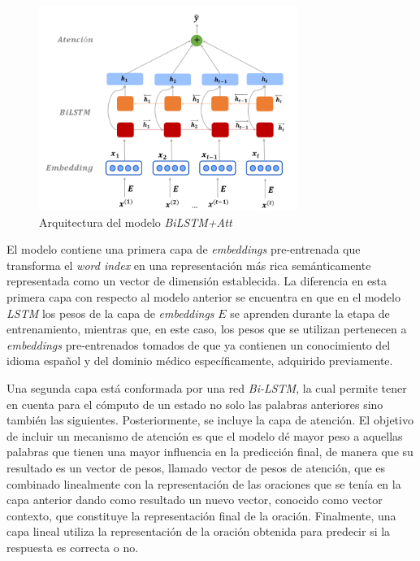 \begin{figure}[!tb]
  \begin{center}
    \includegraphics[angle=0, width=0.75\textwidth]{Graphics/bilstm.png}
  \end{center}
    \caption{Arquitectura del modelo \textit{BiLSTM+Att}}\label{bilstm}
\end{figure}

El modelo contiene una primera capa de \textit{embeddings} pre-entrenada que transforma el \textit{word index} en una representación más rica semánticamente representada como un vector de dimensión establecida. La diferencia en esta primera capa con respecto al modelo anterior se  encuentra en que en el modelo \textit{LSTM} los pesos de la capa de \textit{embeddings} $E$ se aprenden durante la etapa de entrenamiento, mientras que, en este caso, los pesos que se utilizan pertenecen a \textit {embeddings} pre-entrenados tomados de \cite{2019-medical-fastext} que ya contienen un conocimiento del idioma español y del dominio médico específicamente, adquirido previamente.

Una segunda capa está conformada por una red \textit{Bi-LSTM}, la cual permite tener en cuenta para el cómputo de un estado no solo las palabras anteriores sino también las siguientes. Posteriormente, se incluye la capa de atención. El objetivo de incluir un mecanismo de atención es que el modelo dé mayor peso a aquellas palabras que tienen una mayor influencia en la predicción final, de manera que su resultado es un vector de pesos, llamado vector de pesos de atención, que es combinado linealmente con la representación de las oraciones que se tenía en la capa anterior dando como resultado un nuevo vector, conocido como vector contexto, que constituye la representación final de la oración. Finalmente, una capa lineal utiliza la representación de la oración obtenida para predecir si la respuesta es correcta o no.

